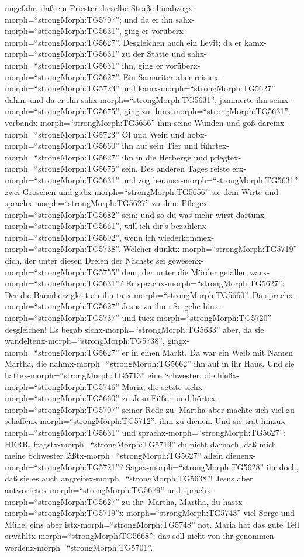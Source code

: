 ungefähr, daß ein Priester dieselbe Straße
hinabzogx-morph=``strongMorph:TG5707''; und da er ihn
sahx-morph=``strongMorph:TG5631'', ging er
vorüberx-morph=``strongMorph:TG5627''.  Desgleichen auch
ein Levit; da er kamx-morph=``strongMorph:TG5631'' zu der Stätte und
sahx-morph=``strongMorph:TG5631'' ihn, ging er
vorüberx-morph=``strongMorph:TG5627''.  Ein Samariter aber
reistex-morph=``strongMorph:TG5723'' und
kamx-morph=``strongMorph:TG5627'' dahin; und da er ihn
sahx-morph=``strongMorph:TG5631'', jammerte ihn
seinx-morph=``strongMorph:TG5675'',  ging zu
ihmx-morph=``strongMorph:TG5631'', verbandx-morph=``strongMorph:TG5656''
ihm seine Wunden und goß dareinx-morph=``strongMorph:TG5723'' Öl und
Wein und hobx-morph=``strongMorph:TG5660'' ihn auf sein Tier und
führtex-morph=``strongMorph:TG5627'' ihn in die Herberge und
pflegtex-morph=``strongMorph:TG5675'' sein.  Des anderen
Tages reiste erx-morph=``strongMorph:TG5631'' und zog
herausx-morph=``strongMorph:TG5631'' zwei Groschen und
gabx-morph=``strongMorph:TG5656'' sie dem Wirte und
sprachx-morph=``strongMorph:TG5627'' zu ihm:
Pflegex-morph=``strongMorph:TG5682'' sein; und so du was mehr wirst
dartunx-morph=``strongMorph:TG5661'', will ich dir's
bezahlenx-morph=``strongMorph:TG5692'', wenn ich
wiederkommex-morph=``strongMorph:TG5738''.  Welcher
dünktx-morph=``strongMorph:TG5719'' dich, der unter diesen Dreien der
Nächste sei gewesenx-morph=``strongMorph:TG5755'' dem, der unter die
Mörder gefallen warx-morph=``strongMorph:TG5631''?  Er
sprachx-morph=``strongMorph:TG5627'': Der die Barmherzigkeit an ihn
tatx-morph=``strongMorph:TG5660''. Da
sprachx-morph=``strongMorph:TG5627'' Jesus zu ihm: So gehe
hinx-morph=``strongMorph:TG5737'' und tuex-morph=``strongMorph:TG5720''
desgleichen!  Es begab sichx-morph=``strongMorph:TG5633''
aber, da sie wandeltenx-morph=``strongMorph:TG5738'',
gingx-morph=``strongMorph:TG5627'' er in einen Markt. Da war ein Weib
mit Namen Martha, die nahmx-morph=``strongMorph:TG5662'' ihn auf in ihr
Haus.  Und sie hattex-morph=``strongMorph:TG5713'' eine
Schwester, die hießx-morph=``strongMorph:TG5746'' Maria; die setzte
sichx-morph=``strongMorph:TG5660'' zu Jesu Füßen und
hörtex-morph=``strongMorph:TG5707'' seiner Rede zu.  Martha
aber machte sich viel zu schaffenx-morph=``strongMorph:TG5712'', ihm zu
dienen. Und sie trat hinzux-morph=``strongMorph:TG5631'' und
sprachx-morph=``strongMorph:TG5627'': HERR,
fragstx-morph=``strongMorph:TG5719'' du nicht darnach, daß mich meine
Schwester läßtx-morph=``strongMorph:TG5627'' allein
dienenx-morph=``strongMorph:TG5721''? Sagex-morph=``strongMorph:TG5628''
ihr doch, daß sie es auch angreifex-morph=``strongMorph:TG5638''!
 Jesus aber antwortetex-morph=``strongMorph:TG5679'' und
sprachx-morph=``strongMorph:TG5627'' zu ihr: Martha, Martha, du
hastx-morph=``strongMorph:TG5719''x-morph=``strongMorph:TG5743'' viel
Sorge und Mühe;  eins aber
istx-morph=``strongMorph:TG5748'' not. Maria hat das gute Teil
erwähltx-morph=``strongMorph:TG5668''; das soll nicht von ihr genommen
werdenx-morph=``strongMorph:TG5701''.

